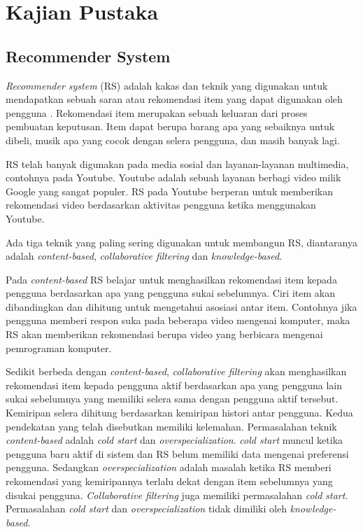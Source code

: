 \chapter{Kajian Pustaka}

\section{Recommender System}

\textit{Recommender system} (RS) adalah kakas dan teknik yang digunakan untuk mendapatkan sebuah saran atau rekomendasi item yang dapat digunakan oleh pengguna \cite{ricci2011book}. Rekomendasi item merupakan sebuah keluaran dari proses pembuatan keputusan. Item dapat berupa barang apa yang sebaiknya untuk dibeli, musik apa yang cocok dengan selera pengguna, dan masih banyak lagi.
\par
RS telah banyak digunakan pada media sosial dan layanan-layanan multimedia, contohnya pada Youtube. Youtube adalah sebuah layanan berbagi video milik Google yang sangat populer. RS pada Youtube berperan untuk memberikan rekomendasi video berdasarkan aktivitas pengguna ketika menggunakan Youtube.
\par
Ada tiga teknik yang paling sering digunakan untuk membangun RS, diantaranya adalah \textit{content-based}, \textit{collaborative filtering} dan \textit{knowledge-based}. 
\par
Pada \textit{content-based} RS belajar untuk menghasilkan rekomendasi item kepada pengguna berdasarkan apa yang pengguna sukai sebelumnya\cite{moreno2013sigtur}. Ciri item akan dibandingkan dan dihitung untuk mengetahui asosiasi antar item. Contohnya jika pengguna memberi respon suka pada beberapa video mengenai komputer, maka RS akan memberikan rekomendasi berupa video yang berbicara mengenai pemrograman komputer.
\par
Sedikit berbeda dengan \textit{content-based}, \textit{collaborative filtering} akan menghasilkan rekomendasi item kepada pengguna aktif berdasarkan apa yang pengguna lain sukai sebelumnya yang memiliki selera sama dengan pengguna aktif tersebut\cite{castillo2008samap}. Kemiripan selera dihitung berdasarkan kemiripan histori antar pengguna.
Kedua pendekatan yang telah disebutkan memiliki kelemahan. Permasalahan teknik \textit{content-based} adalah \textit{cold start} dan \textit{overspecialization}. \textit{cold start} muncul ketika pengguna baru aktif di sistem dan RS belum memiliki data mengenai preferensi pengguna. Sedangkan \textit{overspecialization} adalah masalah ketika RS memberi rekomendasi yang kemiripannya terlalu dekat dengan item sebelumnya yang disukai pengguna\cite{blanco2008flexible}. \textit{Collaborative filtering} juga memiliki permasalahan \textit{cold start}\cite{ricci2011book}. Permasalahan \textit{cold start} dan \textit{overspecialization} tidak dimiliki oleh \textit{knowledge-based}.
